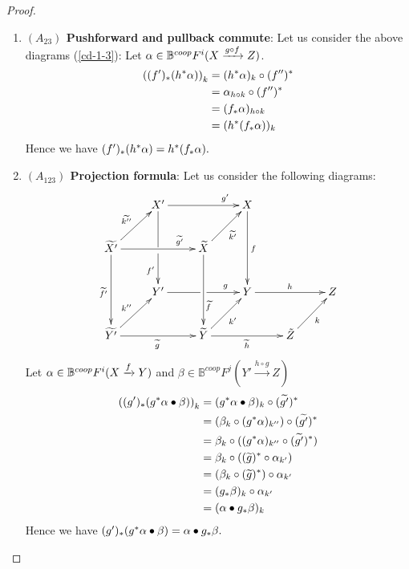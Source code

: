 \documentclass[a4paper]{amsart}
\begin{document}
\begin{proof}
\begin{enumerate}
\begin{align*}
\end{align*}
Hence we have $h^*(\alp \bullet \beta) = (h')^*\alp \bullet h^*\beta.$
\item {\bf $(A_{23})$ Pushforward and pullback commute}: Let us consider the above diagrams (\ref{cd-1-3}): Let $\alpha \in 
\mathbb B^{coop}F^i(X \xrightarrow {g \circ f} Z)$.
\begin{align*}
\left ((f')_*(h^*\alpha) \right)_k & = (h^*\alpha)_k \circ (f'')^*\\
& = \alpha_{h \circ k} \circ (f'')^*\\
& = (f_*\alpha)_{h \circ k} \\
& = (h^*(f_*\alpha))_k
\end{align*}
Hence we have $(f')_*(h^*\alpha)= h^*(f_*\alpha).$
\item {\bf $(A_{123})$ Projection formula}: 
Let us consider the following diagrams:
\begin{equation}
\xymatrix
{
& X'\ar[rr]^{\qquad \qquad g'} \ar'[d][dd]_{f'} && X \ar[dd]^f &&\\
\widetilde {X'} \ar[ur]^{\widetilde {k''}} \ar[dd]_{\widetilde{f'}}  \ar[rr]^{\qquad \qquad \widetilde {g'}} && \widetilde X \ar[dd] \ar[ur]_{\widetilde {k'}} & & &\\
& Y' \ar'[r][rr]^g && Y \ar[rr]^h && Z\\
\widetilde {Y'} \ar[ur]^{k''} \ar[rr]_{\widetilde g} && \widetilde Y \ar[ur]_{k'}^{\widetilde f \quad } \ar[rr]_{\widetilde h} && \tilde Z \ar[ur]_k
}
\end{equation}
Let $\alpha \in  \mathbb B^{coop}F^i(X \xrightarrow f Y)$ and $\beta \in  \mathbb B^{coop}F^j(Y' \xrightarrow {h \circ g} Z)$
\begin{align*}
\left ((g')_*(g^*\alpha \bullet \beta ) \right)_k & = (g^*\alpha \bullet \beta )_k \circ (\widetilde {g'})^*\\
& = (\beta_k \circ (g^*\alpha)_{k''} ) \circ (\widetilde {g'})^*\\
& = \beta_k \circ  ((g^*\alpha)_{k''} \circ (\widetilde {g'})^* )\\
& = \beta_k \circ  ((\widetilde g)^* \circ \alpha_{k'} )\\
& = ( \beta_k \circ  (\widetilde g)^*) \circ \alpha_{k'} \\
& = (g_*\beta)_k \circ \alpha_{k'} \\
& = (\alpha \bullet g_*\beta)_k
\end{align*}
Hence we have $(g')_*(g^*\alpha \bullet \beta )= \alpha \bullet g_*\beta.$
\end{enumerate}
\end{proof}
\end{document}

